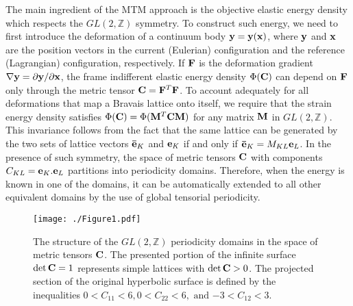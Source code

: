 \documentclass[CRPHYS,Unicode,manuscript]{cedram}
\begin{document}
The main ingredient  of the  MTM approach   is the   objective elastic energy density which  respects
%
the  $GL(2,\mathbb Z)$ symmetry.  To construct such energy, we need to first introduce   the  deformation  of  a  continuum  body $\bold y=\bold y(\bold x)$,  where $\bold y$ and  $\bold x$ are the position vectors in  the current  (Eulerian) configuration  and the  reference (Lagrangian) configuration, respectively. If  ${\bf F}  $ is the deformation gradient  $\nabla \bold y  = \partial \bold y/\partial \bold x$, the  frame indifferent elastic  energy density  $\Phi (\bold C)$ can  depend  on $\bold F$ only through the metric tensor $\bold C = \bold F^T\bold F$.  To account adequately for all deformations that map a Bravais lattice onto itself, we require that the strain energy density   satisfies
$\Phi (\bold C) = \Phi (\bold M^T\bold C\bold M)$
      for any matrix $\bold M$  in $GL(2,\mathbb Z)$. 
      This invariance  follows   from the fact that the same    lattice  can be generated by the  two sets of lattice vectors ${\bf \bar e}_K$ and ${\bf e}_K$     if and only if  $  {\bf\bar e}_K  =  M_{KL}{\bf e}_L$. 
       In the presence of such symmetry, the space of metric tensors $\bold C$ with components 
      $ C_{KL}={\bf e}_K.{\bf e}_L$
        partitions into periodicity domains.  Therefore, when the energy is known in one of the  domains, it can be automatically extended to all  other equivalent domains by the use of global tensorial periodicity. 
     

\begin{figure}[h!]
\texttt{[image: ./Figure1.pdf]}
\caption{\scriptsize {The structure of the  $GL(2,\mathbb Z)$ periodicity domains  in  the space of metric tensors ${\bf C}$. The presented  portion of the infinite  surface $\det{\bf C}=1$  represents  simple lattices with  $\det{\bold C}>0$.  The projected section of the original hyperbolic surface is defined by the inequalities 
  ${0<C_{11} <6}, {0<C_{22}<6}, \text{ and } {-3<C_{12}<3}.$}}
\label{fig:detc1}
\end{figure}
%
\end{document}
